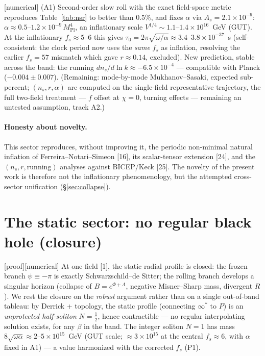 \documentclass[11pt,a4paper]{article}
\newcommand{\statut}[1]{{\footnotesize\textsf{[#1]}}}
\newcommand{\Mpl}{M_{\mathrm{Pl}}}
\theoremstyle{definition}
\begin{document}
\statut{numerical} (A1) Second-order slow roll with the exact field-space metric reproduces
Table~\ref{tab:nsr} to better than $0.5\%$, and fixes $\alpha$ via $A_s=2.1\times10^{-9}$:
$\alpha\approx0.5$--$1.2\times10^{-9}\,\Mpl^4$, an inflationary scale
$V^{1/4}\sim1.1$--$1.4\times10^{16}$~GeV (GUT). At the inflationary $f_s\approx5$--$6$ this
gives $\tau_0=2\pi\sqrt{\omega/\alpha}\approx3.4$--$3.8\times10^{-37}$~s (self-consistent: the
clock period now uses the \emph{same} $f_s$ as inflation, resolving the earlier $f_s=57$
mismatch which gave $r\approx0.14$, excluded). New prediction, stable across the band: the
running $dn_s/d\ln k\approx-6.5\times10^{-4}$ --- compatible with Planck ($-0.004\pm0.007$).
(Remaining: mode-by-mode Mukhanov--Sasaki, expected sub-percent; $(n_s,r,\alpha)$ are computed
on the single-field representative trajectory, the full two-field treatment --- $f$ offset at
$\chi=0$, turning effects --- remaining an untested assumption, track A2.)

\paragraph{Honesty about novelty.} This sector reproduces, without improving it, the periodic
non-minimal natural inflation of Ferreira--Notari--Simeon [16], its scalar-tensor extension
[24], and the $(n_s,r,\text{running})$ analyses against BICEP/Keck [25]. The novelty of the
present work is therefore not the inflationary phenomenology, but the attempted cross-sector
unification (\S\ref{sec:collapse}).

\section{The static sector: no regular black hole (closure)}\label{sec:static}
\statut{proof}\statut{numerical} At one field [1], the static radial profile is closed: the
frozen branch $\psi\equiv-\pi$ is exactly Schwarzschild--de Sitter; the rolling branch
develops a singular horizon (collapse of $B=e^{\Phi+\Lambda}$, negative Misner--Sharp mass,
divergent $R$). We rest the closure on the \emph{robust} argument rather than on a
single out-of-band tableau: by Derrick + topology, the static profile (connecting $\infty^*$
to $P$) is an \emph{unprotected half-soliton} $N=\tfrac12$, hence contractible --- no regular
interpolating solution exists, for any $\beta$ in the band. The integer soliton $N=1$ has mass
$8\sqrt{\omega\alpha}\approx2$--$5\times10^{15}$~GeV (GUT scale; $\approx3\times10^{15}$ at the
central $f_s\approx6$, with $\alpha$ fixed in A1) --- a value harmonized with the corrected
$f_s$ (P1).
\end{document}
